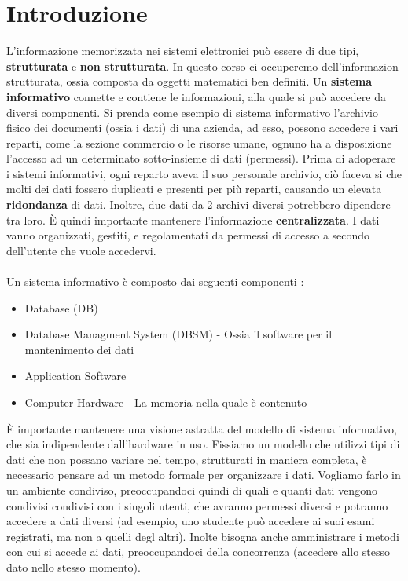 \documentclass[12pt, letterpaper]{article}
\begin{document}
\section{Introduzione}
L'informazione memorizzata nei sistemi elettronici può essere di due tipi, \textbf{strutturata}
e \textbf{non strutturata}. In questo corso ci occuperemo dell'informazion strutturata, ossia composta da 
oggetti matematici ben definiti. Un \textbf{sistema informativo} connette e contiene le informazioni,
alla quale si può accedere da diversi componenti. Si prenda come esempio di sistema informativo l'archivio
fisico dei documenti (ossia i dati) di una azienda, ad esso, possono accedere i vari reparti, come la sezione 
commercio o le risorse umane, ognuno ha a disposizione l'accesso ad un determinato sotto-insieme di dati (permessi).
Prima di adoperare i sistemi informativi, ogni reparto aveva il suo personale archivio, ciò faceva si che molti dei dati
fossero duplicati e presenti per più reparti, causando un elevata \textbf{ridondanza} di dati. Inoltre, due dati da 2 archivi
diversi potrebbero dipendere tra loro. È quindi importante mantenere l'informazione \textbf{centralizzata}.
I dati vanno organizzati, gestiti, e regolamentati da permessi di accesso a secondo dell'utente che vuole accedervi.
\\\\Un sistema informativo è composto dai seguenti componenti : 
\begin{itemize}
    \item Database (DB)
    \item Database Managment System (DBSM) - Ossia il software per il mantenimento dei dati  
    \item Application Software
    \item Computer Hardware - La memoria nella quale è contenuto
\end{itemize}
È importante mantenere una visione astratta del modello di sistema informativo, che sia indipendente
dall'hardware in uso. Fissiamo un modello che utilizzi tipi di dati che non possano variare nel tempo,
strutturati in maniera completa, è necessario pensare ad un metodo formale per organizzare i dati.
Vogliamo farlo in un ambiente condiviso, preoccupandoci quindi di quali e quanti dati vengono condivisi condivisi
con i singoli utenti, che avranno permessi diversi e potranno accedere a dati diversi (ad esempio, uno studente può
accedere ai suoi esami registrati, ma non a quelli degl altri). Inolte bisogna anche amministrare i metodi
con cui si accede ai dati, preoccupandoci della concorrenza (accedere allo stesso dato nello stesso momento).
\end{document}
